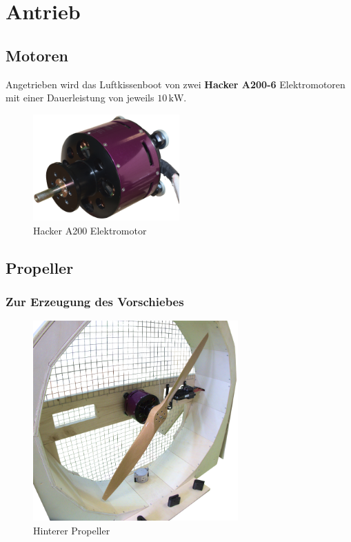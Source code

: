 \section{Antrieb}
\subsection{Motoren}
Angetrieben wird das Luftkissenboot von zwei \textbf{Hacker A200-6} Elektromotoren mit einer Dauerleistung von jeweils $10\,\mathrm{kW}$.
\begin{figure}[h]
    \centering
    \includegraphics[width=0.5\textwidth]{Fotos/Motor.png}
    \caption{Hacker A200 Elektromotor}
\end{figure}
\newpage
\subsection{Propeller}
\subsubsection{Zur Erzeugung des Vorschiebes}

\begin{figure}[h]
    \centering
    \includegraphics[width=0.7\textwidth]{Fotos/Propeller_Hinten.png}
    \caption{Hinterer Propeller}
\end{figure}


